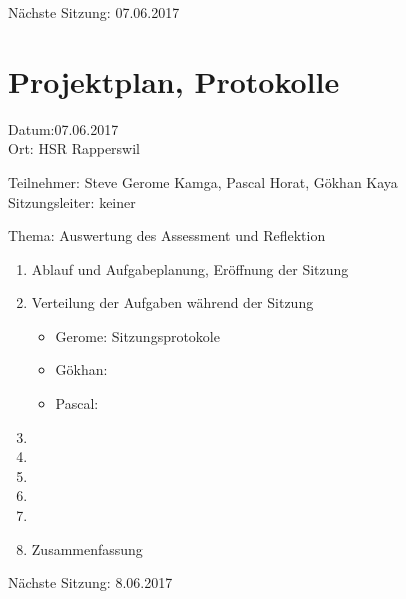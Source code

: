 Nächste Sitzung: 07.06.2017

\newpage
\section*{Projektplan, Protokolle}

Datum:07.06.2017\\
Ort: HSR Rapperswil

Teilnehmer: Steve Gerome Kamga, Pascal Horat, Gökhan Kaya\\
Sitzungsleiter: keiner

Thema: Auswertung des Assessment und Reflektion
\begin{enumerate}

\item Ablauf und Aufgabeplanung, Eröffnung der Sitzung 

\item  Verteilung der Aufgaben während der Sitzung
\begin{itemize}
\item Gerome: Sitzungsprotokole
\item Gökhan: 
\item Pascal: 
\end{itemize}

\item 

\item 

\item 	

\item 	
\item 

\item Zusammenfassung

\end{enumerate}

Nächste Sitzung: 8.06.2017

\newpage

